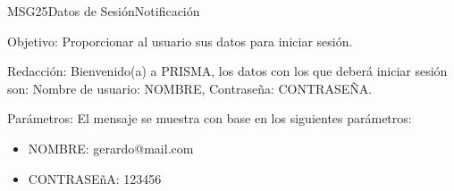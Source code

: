 \begin{mensaje}{MSG25}{Datos de Sesión}{Notificación}
	\item [Objetivo:] Proporcionar al usuario sus datos para iniciar sesión.
	\item[Redacción:] Bienvenido(a) a PRISMA, los datos con los que deberá iniciar sesión son: Nombre de usuario: NOMBRE, Contraseña: CONTRASEÑA.
	\item[Parámetros:] El mensaje se muestra con base en los siguientes parámetros:
	\begin{itemize}
		\item NOMBRE: gerardo@mail.com
		\item CONTRASEñA: 123456
	\end{itemize}
\end{mensaje}